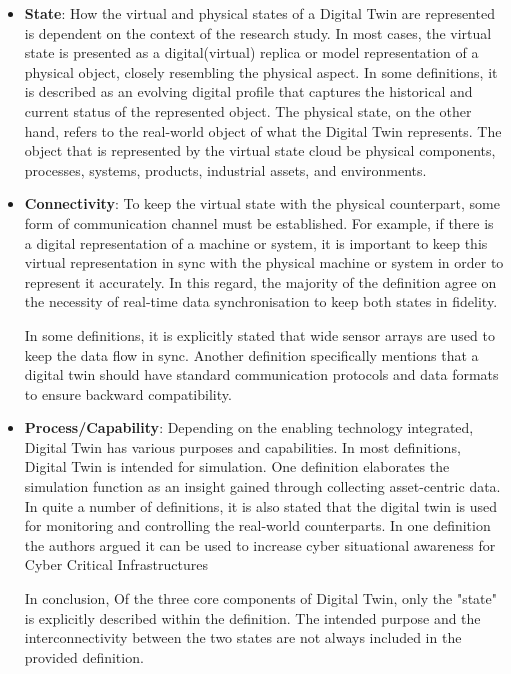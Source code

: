 \begin{itemize}
    \item \textbf{State}: How the virtual and physical states of a Digital Twin are represented is dependent on the context of the research study. In most cases, the virtual state is presented as a digital(virtual) replica or model representation of a physical object, closely resembling the physical aspect. In some definitions, it is described as an evolving digital profile that captures the historical and current status of the represented object. The physical state, on the other hand, refers to the real-world object of what the Digital Twin represents. The object that is represented by the virtual state cloud be physical components, processes, systems, products, industrial assets, and environments.

    \item \textbf{Connectivity}: To keep the virtual state with the physical counterpart, some form of communication channel must be established. For example, if there is a digital representation of a machine or system, it is important to keep this virtual representation in sync with the physical machine or system in order to represent it accurately. In this regard, the majority of the definition agree on the necessity of real-time data synchronisation to keep both states in fidelity.
    
    In some definitions, it is explicitly stated that wide sensor arrays are used to keep the data flow in sync. Another definition specifically mentions that a digital twin should have standard communication protocols and data formats to ensure backward compatibility.   

 
    \item \textbf{Process/Capability}: Depending on the enabling technology integrated, Digital Twin has various purposes and capabilities.  In most definitions, Digital Twin is intended for simulation. One definition elaborates the simulation function as an insight gained through collecting asset-centric data. In quite a number of definitions, it is also stated that the digital twin is used for monitoring and controlling the real-world counterparts. In one definition the authors argued it can be used to increase cyber situational awareness for Cyber Critical Infrastructures


    In conclusion, Of the three core components of Digital Twin, only the "state" is explicitly described within the definition. The intended purpose and the interconnectivity between the two states are not always included in the provided definition.



    
\end{itemize}